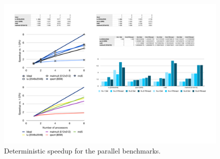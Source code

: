 
\begin{figure}[t!]
\includegraphics[scale=.45]{dspeedup.pdf}
\caption{Deterministic speedup for the parallel benchmarks.}
\label{fig:dspeedup}
\end{figure}

\endinput

